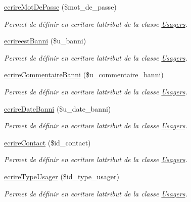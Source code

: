 \begin{DoxyCompactItemize}
\hyperlink{class_usagers_a0fca6236d08081758ee17be03440cd19}{ecrire\+Mot\+De\+Passe} (\$mot\+\_\+de\+\_\+passe)
\begin{DoxyCompactList}\small\item\em Permet de définir en ecriture l\textquotesingle{}attribut de la classe \hyperlink{class_usagers}{Usagers}. \end{DoxyCompactList}\item 
\hyperlink{class_usagers_a9235e41e58d7e7c328d1fa534a13c56a}{ecrireest\+Banni} (\$u\+\_\+banni)
\begin{DoxyCompactList}\small\item\em Permet de définir en ecriture l\textquotesingle{}attribut de la classe \hyperlink{class_usagers}{Usagers}. \end{DoxyCompactList}\item 
\hyperlink{class_usagers_aed3eb1a56858fc14f6440f5784eee91c}{ecrire\+Commentaire\+Banni} (\$u\+\_\+commentaire\+\_\+banni)
\begin{DoxyCompactList}\small\item\em Permet de définir en ecriture l\textquotesingle{}attribut de la classe \hyperlink{class_usagers}{Usagers}. \end{DoxyCompactList}\item 
\hyperlink{class_usagers_a3ab662773095ba43de3b489ca7a84eb7}{ecrire\+Date\+Banni} (\$u\+\_\+date\+\_\+banni)
\begin{DoxyCompactList}\small\item\em Permet de définir en ecriture l\textquotesingle{}attribut de la classe \hyperlink{class_usagers}{Usagers}. \end{DoxyCompactList}\item 
\hyperlink{class_usagers_ab25ab2f1ed9e4668d562422a1fa19ae8}{ecrire\+Contact} (\$id\+\_\+contact)
\begin{DoxyCompactList}\small\item\em Permet de définir en ecriture l\textquotesingle{}attribut de la classe \hyperlink{class_usagers}{Usagers}. \end{DoxyCompactList}\item 
\hyperlink{class_usagers_adc3f6a6e24c34886437a8391612efabe}{ecrire\+Type\+Usager} (\$id\+\_\+type\+\_\+usager)
\begin{DoxyCompactList}\small\item\em Permet de définir en ecriture l\textquotesingle{}attribut de la classe \hyperlink{class_usagers}{Usagers}. \end{DoxyCompactList}\item 

\end{DoxyCompactItemize}
